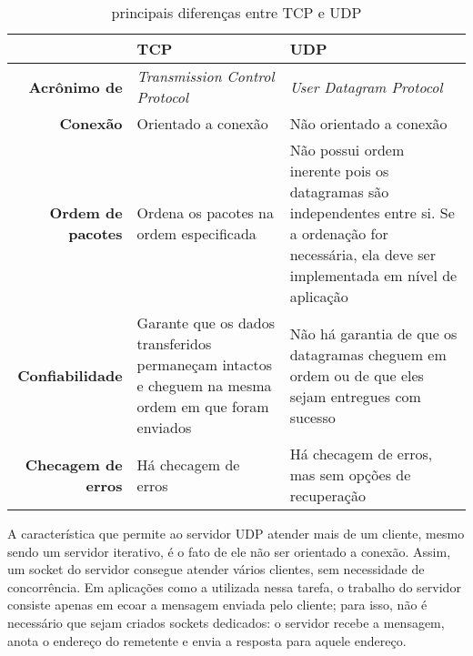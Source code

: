 \documentclass[a4paper,10pt]{article}
\begin{document}
\begin{table}[h]
\centering
\caption{principais diferenças entre TCP e UDP}
\label{tab1}
\begin{tabularx}{\textwidth}{rXX}
\multicolumn{1}{l}{}       & \textbf{TCP}                                                                                        & \textbf{UDP}                                                                                                                                            \\ \hline
\textbf{Acrônimo de}       & \textit{Transmission Control Protocol}                                                                      & \textit{User Datagram Protocol}                                                                                                                         \\ \hline
\textbf{Conexão}           & Orientado a conexão                                                                                 & Não orientado a conexão                                                                                                                                 \\ \hline
\textbf{Ordem de pacotes}  & Ordena os pacotes na ordem especificada                                                             & Não possui ordem inerente pois os datagramas são independentes entre si. Se a ordenação for necessária, ela deve ser implementada em nível de aplicação \\ \hline
\textbf{Confiabilidade}    & Garante que os dados transferidos permaneçam intactos e cheguem na mesma ordem em que foram enviados & Não há garantia de que os datagramas cheguem em ordem ou de que eles sejam entregues com sucesso                                                        \\ \hline
\textbf{Checagem de erros} & Há checagem de erros                                                                                & Há checagem de erros, mas sem opções de recuperação                                                                                                    
\end{tabularx}
\end{table}

A característica que permite ao servidor UDP atender mais de um cliente, mesmo sendo um servidor iterativo, é o fato de ele não ser orientado a conexão. Assim, um socket do servidor consegue atender vários clientes, sem necessidade de concorrência. Em aplicações como a utilizada nessa tarefa, o trabalho do servidor consiste apenas em ecoar a mensagem enviada pelo cliente; para isso, não é necessário que sejam criados sockets dedicados: o servidor recebe a mensagem, anota o endereço do remetente e envia a resposta para aquele endereço.
\end{document}
